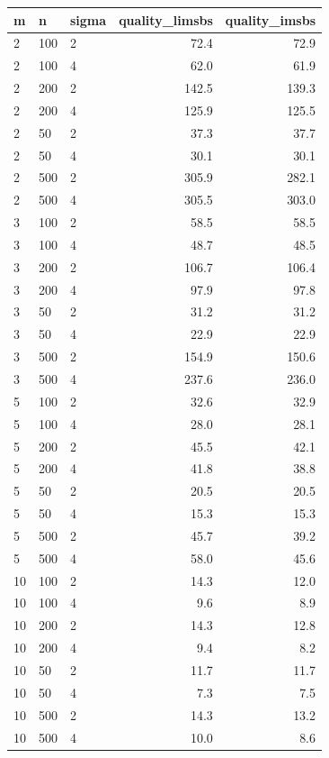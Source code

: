 \begin{tabular}{lllrr}
\toprule
 m &   n & sigma &  quality\_limsbs &  quality\_imsbs \\
\midrule
 2 & 100 &     2 &            72.4 &           72.9 \\
 2 & 100 &     4 &            62.0 &           61.9 \\
 2 & 200 &     2 &           142.5 &          139.3 \\
 2 & 200 &     4 &           125.9 &          125.5 \\
 2 &  50 &     2 &            37.3 &           37.7 \\
 2 &  50 &     4 &            30.1 &           30.1 \\
 2 & 500 &     2 &           305.9 &          282.1 \\
 2 & 500 &     4 &           305.5 &          303.0 \\
 3 & 100 &     2 &            58.5 &           58.5 \\
 3 & 100 &     4 &            48.7 &           48.5 \\
 3 & 200 &     2 &           106.7 &          106.4 \\
 3 & 200 &     4 &            97.9 &           97.8 \\
 3 &  50 &     2 &            31.2 &           31.2 \\
 3 &  50 &     4 &            22.9 &           22.9 \\
 3 & 500 &     2 &           154.9 &          150.6 \\
 3 & 500 &     4 &           237.6 &          236.0 \\
 5 & 100 &     2 &            32.6 &           32.9 \\
 5 & 100 &     4 &            28.0 &           28.1 \\
 5 & 200 &     2 &            45.5 &           42.1 \\
 5 & 200 &     4 &            41.8 &           38.8 \\
 5 &  50 &     2 &            20.5 &           20.5 \\
 5 &  50 &     4 &            15.3 &           15.3 \\
 5 & 500 &     2 &            45.7 &           39.2 \\
 5 & 500 &     4 &            58.0 &           45.6 \\
10 & 100 &     2 &            14.3 &           12.0 \\
10 & 100 &     4 &             9.6 &            8.9 \\
10 & 200 &     2 &            14.3 &           12.8 \\
10 & 200 &     4 &             9.4 &            8.2 \\
10 &  50 &     2 &            11.7 &           11.7 \\
10 &  50 &     4 &             7.3 &            7.5 \\
10 & 500 &     2 &            14.3 &           13.2 \\
10 & 500 &     4 &            10.0 &            8.6 \\
\bottomrule
\end{tabular}
